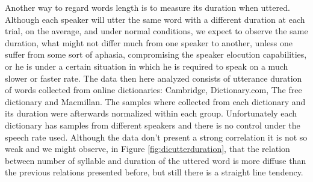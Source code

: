 Another way to regard words length is to measure its duration when uttered.
Although each speaker will utter the same word with a different duration at each
trial, on the average, and under normal conditions, we expect to observe the same
duration, what might not differ much from one speaker to another, unless 
one suffer from some sort of aphasia, compromising the speaker elocution capabilities,
or he is under a certain situation in which he is required to speak on a much slower or 
faster rate. The data then here analyzed consists of utterance duration of words
collected from online dictionaries: Cambridge, Dictionary.com, The free dictionary and Macmillan. 
The samples where collected from each dictionary and
its duration were afterwards normalized within each group. Unfortunately each dictionary has
samples from different speakers and there is no control under the speech rate used.
Although the data don't present
a strong correlation it is not so weak and we might observe, in Figure \ref{fig:dicutterduration},
that the relation between number of syllable and duration of the uttered word is
more diffuse than the previous relations presented before, but still there is a 
straight line tendency.


